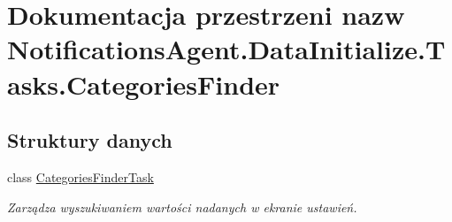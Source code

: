 \hypertarget{a00299}{}\section{Dokumentacja przestrzeni nazw Notifications\+Agent.\+Data\+Initialize.\+Tasks.\+Categories\+Finder}
\label{a00299}
\subsection*{Struktury danych}
\begin{DoxyCompactItemize}
\item 
class \hyperlink{a00008}{Categories\+Finder\+Task}
\begin{DoxyCompactList}\small\item\em Zarządza wyszukiwaniem wartości nadanych w ekranie ustawień. \end{DoxyCompactList}\end{DoxyCompactItemize}
